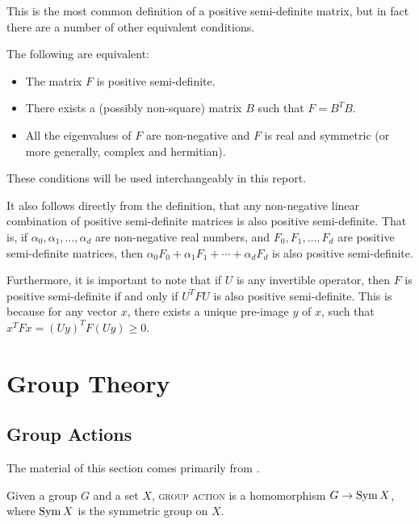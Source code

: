 \documentclass{report}
\begin{document}
    This is the most common definition of a positive semi-definite matrix, but
    in fact there are a number of other equivalent conditions.

    \begin{thm}
      The following are equivalent:
      \begin{itemize}
        \item The matrix $F$ is positive semi-definite.
        \item There exists a (possibly non-square) matrix $B$ such that $F = B^T
          B$.
        \item All the eigenvalues of $F$ are non-negative and $F$ is real and
          symmetric (or more generally, complex and hermitian).
      \end{itemize}
    \end{thm}

    These conditions will be used interchangeably in this report.

    It also follows directly from the definition, that any non-negative linear
    combination of positive semi-definite matrices is also positive
    semi-definite.  That is, if $\alpha_0, \alpha_1, \ldots, \alpha_d$ are
    non-negative real numbers, and $F_0, F_1, \ldots, F_d$ are positive
    semi-definite matrices, then $\alpha_0 F_0 + \alpha_1 F_1 + \cdots +
    \alpha_d F_d$ is also positive semi-definite.

    Furthermore, it is important to note that if $U$ is any invertible operator,
    then $F$ is positive semi-definite if and only if $U^TFU$ is also positive
    semi-definite.  This is because for any vector $x$, there exists a unique
    pre-image $y$ of $x$, such that $x^T F x = (Uy)^T F (Uy) \geq 0$.

\chapter{Group Theory}
  \section{Group Actions}
    The material of this section comes primarily from \cite[Section~1.7;
    Chapter~4]{dummit-foote}.

    \begin{defn}\label{defn:group-action}
      Given a group $G$ and a set $X$,
      \textsc{group action} is a homomorphism $G \to \operatorname{Sym} X$,
      where $\operatorname{Sym} X$ is the symmetric group on $X$.
    \end{defn}
\end{document}
